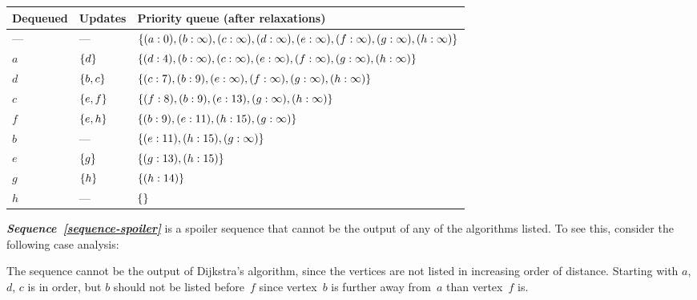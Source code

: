 \documentclass{jn-pset}
\begin{document}
\begin{problem}
\begin{solution}
  \medskip
  \noindent
  \begin{tabular}[]{|l|l|l|}
    \hline
    \textbf{Dequeued}
    &
      \textbf{Updates}
    &
      \textbf{Priority queue (after relaxations)}
    \\
    \hline
    ---
    &
      ---
    &
      $
      \{ 
      (a: 0),
      (b: \infty),
      (c: \infty),
      (d: \infty),
      (e: \infty),
      (f: \infty),
      (g: \infty),
      (h: \infty)
       \}
      $
    \\
    $a$
    &
      $\{ d \}$
    &
      $
      \{ 
      (d: 4),
      (b: \infty),
      (c: \infty),
      (e: \infty),
      (f: \infty),
      (g: \infty),
      (h: \infty)
       \}
      $
    \\
    $d$
    &
      $\{ b, c \}$
    &
      $
      \{ 
      (c: 7),
      (b: 9),
      (e: \infty),
      (f: \infty),
      (g: \infty),
      (h: \infty)
       \}
      $
    \\
    $c$
    &
      $\{ e, f \}$
    &
      $
      \{ 
      (f: 8),
      (b: 9),
      (e: 13),
      (g: \infty),
      (h: \infty)
       \}
      $
    \\
    $f$
    &
      $\{ e, h \}$
    &
      $
      \{ 
      (b: 9),
      (e: 11),
      (h: 15),      
      (g: \infty)
       \}
      $
    \\
    $b$
    &
      ---
    &
      $
      \{ 
      (e: 11),
      (h: 15),      
      (g: \infty)
       \}
      $
    \\
    $e$
    &
      $\{ g \}$
    &
      $
      \{ 
      (g: 13),
      (h: 15)   
       \}
      $
    \\
    $g$
    &
      $\{ h \}$
    &
      $
      \{ 
      (h: 14)   
       \}
      $
    \\
    $h$
    &
      ---
    &
      $
      \{ 
       \}
      $
    \\
    \hline
  \end{tabular}

  \bigskip

  
  \textit{\textbf{Sequence~\ref{sequence-spoiler}}}
  is a spoiler sequence that cannot be the output of any of the
  algorithms listed. To see this, consider the following case
  analysis:
  \begin{compactitem}
  \item
    The sequence cannot be the output of Dijkstra's algorithm,
    since the vertices are not listed in increasing order of distance.
    Starting with $a$, $d$, $c$ is in order,
    but $b$ should not be listed before~$f$ since 
    vertex~$b$ is further away from~$a$ than vertex~$f$ is.


\end{compactitem}
\end{solution}
\end{problem}
\end{document}
